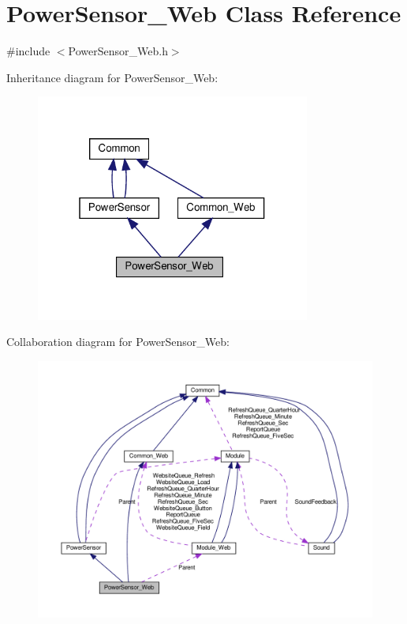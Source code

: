 \hypertarget{class_power_sensor___web}{}\section{Power\+Sensor\+\_\+\+Web Class Reference}
\label{class_power_sensor___web}


{\ttfamily \#include $<$Power\+Sensor\+\_\+\+Web.\+h$>$}



Inheritance diagram for Power\+Sensor\+\_\+\+Web\+:
\nopagebreak
\begin{figure}[H]
\begin{center}
\leavevmode
\includegraphics[width=256pt]{class_power_sensor___web__inherit__graph}
\end{center}
\end{figure}


Collaboration diagram for Power\+Sensor\+\_\+\+Web\+:
\nopagebreak
\begin{figure}[H]
\begin{center}
\leavevmode
\includegraphics[width=350pt]{class_power_sensor___web__coll__graph}
\end{center}
\end{figure}
